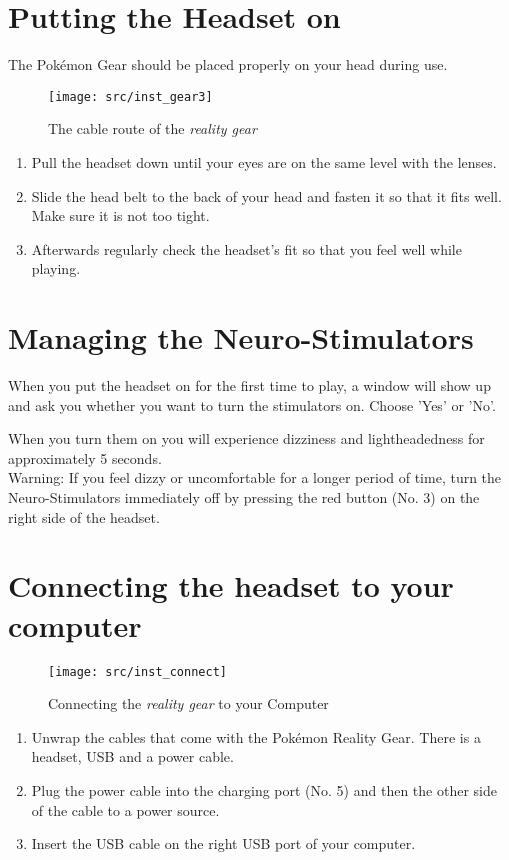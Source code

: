 \section{Putting the Headset on}
The Pokémon Gear should be placed properly on your head during use.
\begin{figure}[!ht]
\begin{center}
\texttt{[image: src/inst\_gear3]}
\end{center}
\caption[The cable route of the \emph{\pokeT{} reality gear}]{The cable route of the \emph{\poke{} reality gear}}
\label{gear_cable}
\end{figure}
\begin{enumerate}
\item Pull the headset down until your eyes are on the same level with the lenses.
\item Slide the head belt to the back of your head and fasten it so that it fits well. Make sure it is not too tight.
\item Afterwards regularly check the headset’s fit so that you feel well while playing.
\end{enumerate}

\section{Managing the Neuro-Stimulators}

When you put the headset on for the first time to play, a window will show up and ask you whether you want to turn the stimulators on. Choose 'Yes' or 'No'.

When you turn them on you will experience dizziness and lightheadedness for approximately 5 seconds. \medskip\\
Warning: If you feel dizzy or uncomfortable for a longer period of time, turn the Neuro-Stimulators immediately off by pressing the red button (No. 3) on the right side of the headset.

\section{Connecting the headset to your computer}
\begin{figure}[!ht]
\begin{center}
\texttt{[image: src/inst\_connect]}
\end{center}
\caption[Connecting the \emph{\pokeT{} reality gear} to your Computer]{Connecting the \emph{\poke{} reality gear} to your Computer}
\label{gear_connect}
\end{figure}
\begin{enumerate}
\item Unwrap the cables that come with the Pokémon Reality Gear. There is a headset, USB and a power cable.
\item	Plug the power cable into the charging port (No. 5) and then the other side of the cable to a power source. 
\item	Insert the USB cable on the right USB port of your computer.
\end{enumerate}

